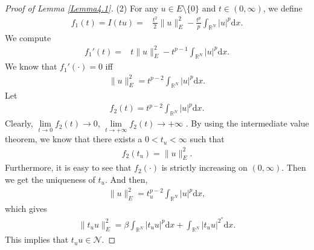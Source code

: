 \documentclass[12pt,a4paper,reqno]{amsart}
\numberwithin{equation}{section}
\begin{document}
\begin{proof}[Proof of Lemma \ref{Lemma4.1}]
(2)
For any $u\in E\setminus\{0\}$ and $t\in (0,\infty)$, we define
\begin{equation*}
\begin{aligned}
f_{1}(t)=I(tu)=&\frac{t^{2}}{2}\|u\|_{E}^{2}-\frac{t^{p}}{p}\int_{\mathbb{R}^{N}}|u|^{p}\mathrm{d}x.
\end{aligned}
\end{equation*}
We compute
\begin{equation*}
\begin{aligned}
f_{1}'(t)
=&t\|u\|_{E}^{2}
-t^{p-1}
\int_{\mathbb{R}^{N}}|u|^{p}\mathrm{d}x.
\end{aligned}
\end{equation*}
We know that $f_{1}'(\cdot)=0$ iff
\begin{equation*}
\begin{aligned}
\|u\|_{E}^{2}
=t^{p-2}
\int_{\mathbb{R}^{N}}|u|^{p}\mathrm{d}x.
\end{aligned}
\end{equation*}
Let
\begin{equation*}
\begin{aligned}
f_{2}(t)
=t^{p-2}
\int_{\mathbb{R}^{N}}|u|^{p}\mathrm{d}x.
\end{aligned}
\end{equation*}
Clearly, $\lim\limits_{t\rightarrow0}f_{2}(t)\rightarrow0$, $\lim\limits_{t\rightarrow+\infty}f_{2}(t)\rightarrow+\infty$ .
By using the intermediate value theorem, we know that there exists a $0<t_{u}<\infty$ such that
\begin{equation*}
\begin{aligned}
f_{2}(t_{u})=\|u\|_{E}^{2}.
\end{aligned}
\end{equation*}
Furthermore, it is easy to see that $f_{2}(\cdot)$ is strictly increasing on $(0,\infty)$.
Then we get the uniqueness of $t_{u}$.
And then,
\begin{equation*}
\begin{aligned}
\|u\|_{E}^{2}
=t_{u}^{p-2}
\int_{\mathbb{R}^{N}}|u|^{p}\mathrm{d}x,
\end{aligned}
\end{equation*}
which gives
\begin{equation*}
\begin{aligned}
\|t_{u}u\|_{E}^{2}
=\beta\int_{\mathbb{R}^{N}}|t_{u}u|^{p}\mathrm{d}x
+\int_{\mathbb{R}^{N}}|t_{u}u|^{2^{*}}\mathrm{d}x.
\end{aligned}
\end{equation*}
This implies that $t_{u}u\in \mathcal{N}$.



\end{proof}
\end{document}
